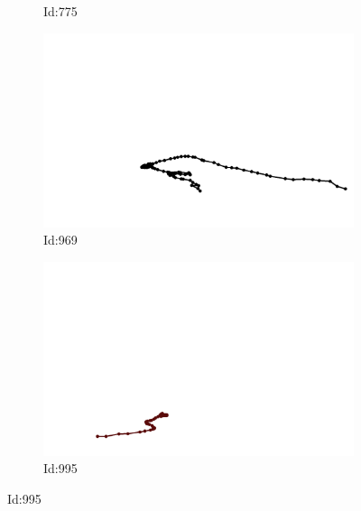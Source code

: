 \documentclass[12pt,twoside]{report}
\begin{document}
\begin{figure}
\begin{subfigure}[b]{0.20\textwidth}
\caption{Id:775}
\end{subfigure}
\begin{subfigure}[b]{0.20\textwidth}
\centering
\includegraphics[width=\textwidth]{../../trajectories/969.png}
\caption{Id:969}
\end{subfigure}
\begin{subfigure}[b]{0.20\textwidth}
\centering
\includegraphics[width=\textwidth]{../../trajectories/995.png}
\caption{Id:995}
\end{subfigure}
\end{figure}
\end{document}
